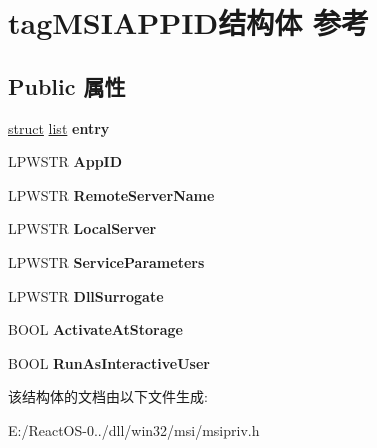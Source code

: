 \hypertarget{structtag_m_s_i_a_p_p_i_d}{}\section{tag\+M\+S\+I\+A\+P\+P\+I\+D结构体 参考}
\label{structtag_m_s_i_a_p_p_i_d}
\subsection*{Public 属性}
\begin{DoxyCompactItemize}
\item 
\mbox{\label{structtag_m_s_i_a_p_p_i_d_a8bc142cf954d51378e49537387ef8c56}} 
\hyperlink{interfacestruct}{struct} \hyperlink{classlist}{list} {\bfseries entry}
\item 
\mbox{\label{structtag_m_s_i_a_p_p_i_d_ad8b3785c1cb1517d2e848980488d4b0d}} 
L\+P\+W\+S\+TR {\bfseries App\+ID}
\item 
\mbox{\label{structtag_m_s_i_a_p_p_i_d_abcae9385708343f09ff72cbcc63a1e85}} 
L\+P\+W\+S\+TR {\bfseries Remote\+Server\+Name}
\item 
\mbox{\label{structtag_m_s_i_a_p_p_i_d_a705c5e8023d208eab14986abd736f110}} 
L\+P\+W\+S\+TR {\bfseries Local\+Server}
\item 
\mbox{\label{structtag_m_s_i_a_p_p_i_d_af5bdb7850505e81a648e280c1b092ca0}} 
L\+P\+W\+S\+TR {\bfseries Service\+Parameters}
\item 
\mbox{\label{structtag_m_s_i_a_p_p_i_d_a5ef2b8e343b0d5bf78eb4426f213e07c}} 
L\+P\+W\+S\+TR {\bfseries Dll\+Surrogate}
\item 
\mbox{\label{structtag_m_s_i_a_p_p_i_d_afeda31a74d5218e18b9288c9611efe62}} 
B\+O\+OL {\bfseries Activate\+At\+Storage}
\item 
\mbox{\label{structtag_m_s_i_a_p_p_i_d_a92ea71b276c8fd90b5e2526088e57e5f}} 
B\+O\+OL {\bfseries Run\+As\+Interactive\+User}
\end{DoxyCompactItemize}


该结构体的文档由以下文件生成\+:\begin{DoxyCompactItemize}
\item 
E\+:/\+React\+O\+S-\/0../dll/win32/msi/msipriv.\+h\end{DoxyCompactItemize}
